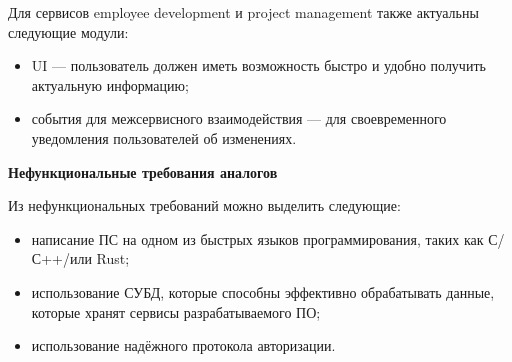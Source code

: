 Для сервисов employee development и project management также актуальны следующие модули:
\begin{itemize}
    \item UI — пользователь должен иметь возможность быстро и удобно получить актуальную информацию;
    \item события для межсервисного взаимодействия — для своевременного уведомления пользователей об изменениях.
\end{itemize}

\bigskip
\textbf{Нефункциональные требования аналогов}

Из нефункциональных требований можно выделить следующие:
\begin{itemize}
    \item написание ПС на одном из быстрых языков программирования, таких как С/С++/\csharp или Rust;
    \item использование СУБД, которые способны эффективно обрабатывать данные, которые хранят сервисы разрабатываемого ПО;
    \item использование надёжного протокола авторизации.
\end{itemize}
